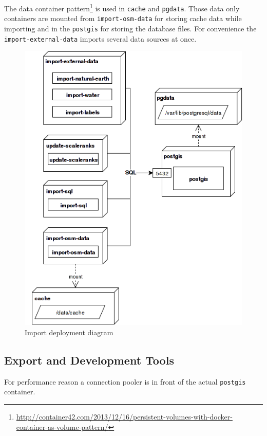 The data container pattern\footnote{\url{http://container42.com/2013/12/16/persistent-volumes-with-docker-container-as-volume-pattern/}} is used in \texttt{cache} and \texttt{pgdata}. Those
data only containers are mounted from \texttt{import-osm-data} for storing cache data while importing and in the \texttt{postgis} for storing the database files.
For convenience the \texttt{import-external-data} imports several data sources at once.

\begin{figure}[h]
  \includegraphics[scale=0.6]{images/deployment_import.png}
  \caption{Import deployment diagram}
\end{figure}

\newpage
\subsection{Export and Development Tools}

For performance reason a connection pooler is in front of the actual \texttt{postgis} container.

